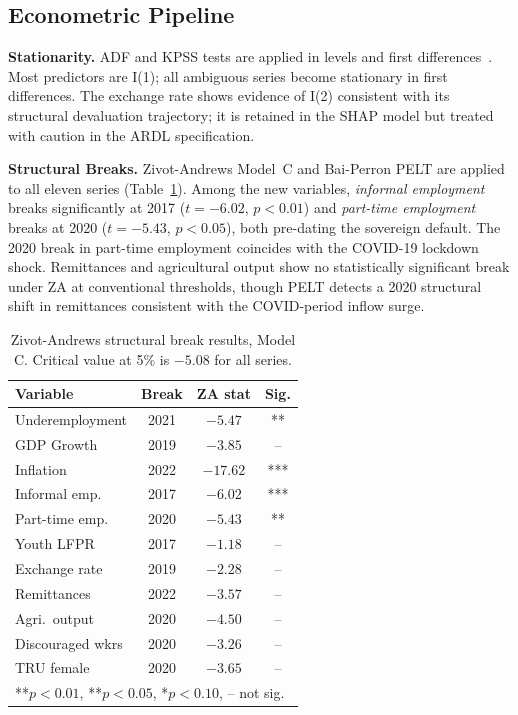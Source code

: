 \documentclass[sigconf]{acmart}
\begin{document}
\subsection{Econometric Pipeline}

\textbf{Stationarity.} ADF and KPSS tests are applied in levels and first
differences~\cite{kpss1992}. Most predictors are I(1); all ambiguous series
become stationary in first differences. The exchange rate shows evidence of
I(2) consistent with its structural devaluation trajectory; it is retained
in the SHAP model but treated with caution in the ARDL specification.

\textbf{Structural Breaks.} Zivot-Andrews Model~C and Bai-Perron PELT are
applied to all eleven series (Table~\ref{tab:za}). Among the new
variables, \emph{informal employment} breaks significantly at 2017
($t{=}{-6.02}$, $p{<}0.01$) and \emph{part-time employment} breaks at 2020
($t{=}{-5.43}$, $p{<}0.05$), both pre-dating the sovereign default. The
2020 break in part-time employment coincides with the COVID-19 lockdown
shock. Remittances and agricultural output show no statistically significant
break under ZA at conventional thresholds, though PELT detects a 2020
structural shift in remittances consistent with the COVID-period inflow surge.

\begin{table}[h]
\caption{Zivot-Andrews structural break results, Model C. Critical value
  at 5\% is $-5.08$ for all series.}
\label{tab:za}
\setlength{\tabcolsep}{3pt}
\footnotesize
\begin{tabular}{lccc}
\toprule
\textbf{Variable} & \textbf{Break} & \textbf{ZA stat} & \textbf{Sig.}\\
\midrule
Underemployment   & 2021 & $-5.47$  & **  \\
GDP Growth        & 2019 & $-3.85$  & --  \\
Inflation         & 2022 & $-17.62$ & *** \\
Informal emp.     & 2017 & $-6.02$  & *** \\
Part-time emp.    & 2020 & $-5.43$  & **  \\
Youth LFPR        & 2017 & $-1.18$  & --  \\
Exchange rate     & 2019 & $-2.28$  & --  \\
Remittances       & 2022 & $-3.57$  & --  \\
Agri.\ output     & 2020 & $-4.50$  & --  \\
Discouraged wkrs  & 2020 & $-3.26$  & --  \\
TRU female        & 2020 & $-3.65$  & --  \\
\midrule
\multicolumn{4}{l}{\scriptsize ***$p{<}0.01$, **$p{<}0.05$, *$p{<}0.10$, -- not sig.}\\
\bottomrule
\end{tabular}
\end{table}
\end{document}
